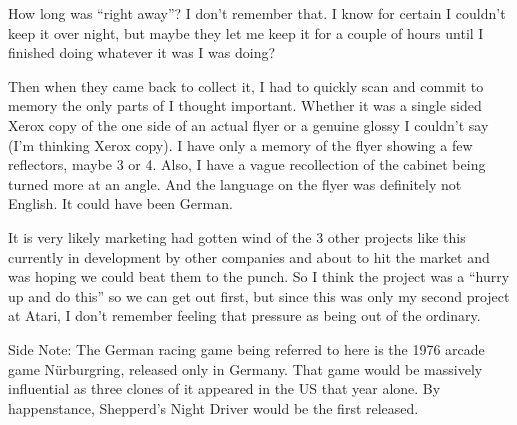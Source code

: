 How long was “right away”? I don't remember that. I know for certain I couldn't keep it over night, but maybe they let me keep it for a couple of hours until I finished doing whatever it was I was doing? 

Then when they came back to collect it, I had to quickly scan and commit to memory the only parts of I thought important. Whether it was a single sided Xerox copy of the one side of an actual flyer or a genuine glossy I couldn't say (I'm thinking Xerox copy). I have only a memory of the flyer showing a few reflectors, maybe 3 or 4. Also, I have a vague recollection of the cabinet being turned more at an angle. And the language on the flyer was definitely not English. It could have been German. 

It is very likely marketing had gotten wind of the 3 other projects like this currently in development by other companies and about to hit the market and was hoping we could beat them to the punch. So I think the project was a “hurry up and do this” so we can get out first, but since this was only my second project at Atari, I don't remember feeling that pressure as being out of the ordinary.

\begin{tcolorbox}[]

        {
        Side Note: The German racing game being referred to here is the 1976 arcade game Nürburgring, released only in Germany. That game would be massively influential as three clones of it appeared in the US that year alone. By happenstance, Shepperd’s Night Driver would be the first released.}

\end{tcolorbox} 

